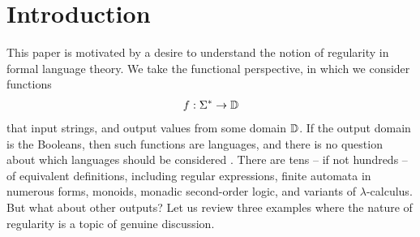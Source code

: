 \section{Introduction}
\label{sec:introduction}

\AP
This paper is motivated by a desire to understand the notion of  regularity in formal language theory. We take the functional perspective, in which we consider functions 
\begin{align*}
f : \Sigma^* \to \mathbb D
\end{align*}
that input strings, and output values from some domain $\mathbb D$. If the output
domain is the Booleans, then such functions are languages, and there is no
question about which languages should be considered . There are tens --
if not hundreds -- of equivalent definitions, including regular expressions,
finite automata in numerous forms, monoids, monadic second-order logic, and
variants of $\lambda$-calculus. But what about other outputs? Let us review
three examples where the nature of regularity is a topic of genuine
discussion.

